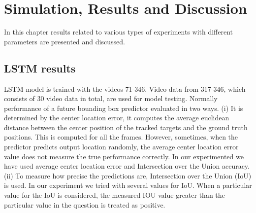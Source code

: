 \chapter{Simulation, Results and Discussion}
In this chapter results related to various types of experiments with different parameters are presented and discussed.

\section{LSTM results}
LSTM model is trained with the videos 71-346. Video data from 317-346, which consists of 30 video data in total, are used for model testing. Normally performance of a future bounding box predictor evaluated  in two ways. 
(i) It is determined by the center location error, it computes the average
euclidean distance between the center position of the tracked targets and the ground truth
positions. This is computed for all the frames. However, sometimes, when the predictor predicts 
output location randomly, the average center location error value does not measure the
true performance correctly. In our experimented we have used average center location error and Intersection over the Union  accuracy. \\

(ii) To measure how precise the predictions are, Intersection over the Union (IoU) is used. In our experiment we tried with several values for IoU. When a particular value for the IoU is considered, the measured IOU value greater than the particular value in the question is treated as positive.

